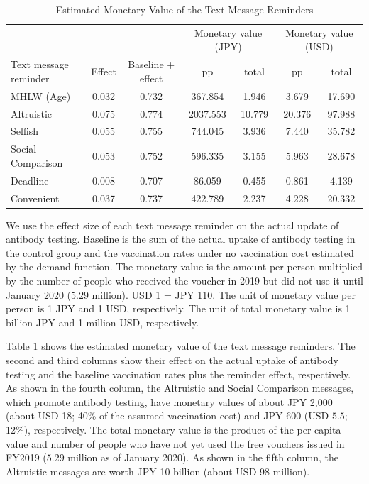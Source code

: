 \documentclass[
  11pt,
  a4paper
]{article}
\begin{document}
\begin{table}

\caption{\label{tab:monetary-value}Estimated Monetary Value of the Text Message Reminders}
\centering
\fontsize{9}{11}\selectfont
\begin{threeparttable}
\begin{tabular}[t]{lcccccc}
\toprule
\multicolumn{3}{c}{ } & \multicolumn{2}{c}{Monetary value (JPY)} & \multicolumn{2}{c}{Monetary value (USD)} \\
\cmidrule(l{3pt}r{3pt}){4-5} \cmidrule(l{3pt}r{3pt}){6-7}
Text message reminder & Effect & Baseline + effect & pp & total & pp & total\\
\midrule
MHLW (Age) & 0.032 & 0.732 & 367.854 & 1.946 & 3.679 & 17.690\\
Altruistic & 0.075 & 0.774 & 2037.553 & 10.779 & 20.376 & 97.988\\
Selfish & 0.055 & 0.755 & 744.045 & 3.936 & 7.440 & 35.782\\
Social Comparison & 0.053 & 0.752 & 596.335 & 3.155 & 5.963 & 28.678\\
Deadline & 0.008 & 0.707 & 86.059 & 0.455 & 0.861 & 4.139\\
Convenient & 0.037 & 0.737 & 422.789 & 2.237 & 4.228 & 20.332\\
\bottomrule
\end{tabular}
\begin{tablenotes}
\item We use the effect size of each text message reminder on the actual update of antibody testing. Baseline is the sum of the actual uptake of antibody testing in the control group and the vaccination rates under no vaccination cost estimated by the demand function. The monetary value is the amount per person multiplied by the number of people who received the voucher in 2019 but did not use it until January 2020 ($5.29$ million). USD 1 = JPY 110. The unit of monetary value per person is 1 JPY and 1 USD, respectively. The unit of total monetary value is 1 billion JPY and 1 million USD, respectively.
\end{tablenotes}
\end{threeparttable}
\end{table}

Table \ref{tab:monetary-value} shows the estimated monetary value of the text message reminders. The second and third columns show their effect on the actual uptake of antibody testing and the baseline vaccination rates plus the reminder effect, respectively. As shown in the fourth column, the Altruistic and Social Comparison messages, which promote antibody testing, have monetary values of about JPY 2,000 (about USD 18; 40\% of the assumed vaccination cost) and JPY 600 (USD \(5.5\); 12\%), respectively. The total monetary value is the product of the per capita value and number of people who have not yet used the free vouchers issued in FY2019 (\(5.29\) million as of January 2020). As shown in the fifth column, the Altruistic messages are worth JPY 10 billion (about USD 98 million).
\end{document}
